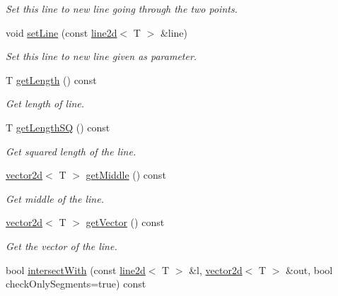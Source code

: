 \begin{DoxyCompactItemize}
\begin{DoxyCompactList}\small\item\em Set this line to new line going through the two points. \end{DoxyCompactList}\item 
\mbox{\label{classirr_1_1core_1_1line2d_af7a159fc82aff5dcab173fcd24934df1}} 
void \hyperlink{classirr_1_1core_1_1line2d_af7a159fc82aff5dcab173fcd24934df1}{set\+Line} (const \hyperlink{classirr_1_1core_1_1line2d}{line2d}$<$ T $>$ \&line)
\begin{DoxyCompactList}\small\item\em Set this line to new line given as parameter. \end{DoxyCompactList}\item 
T \hyperlink{classirr_1_1core_1_1line2d_a7322cb613e5e076ce6ff258e0f67dc0a}{get\+Length} () const
\begin{DoxyCompactList}\small\item\em Get length of line. \end{DoxyCompactList}\item 
T \hyperlink{classirr_1_1core_1_1line2d_ab2e1b51af84b3f134a32ebb0b7e6968f}{get\+Length\+SQ} () const
\begin{DoxyCompactList}\small\item\em Get squared length of the line. \end{DoxyCompactList}\item 
\hyperlink{classirr_1_1core_1_1vector2d}{vector2d}$<$ T $>$ \hyperlink{classirr_1_1core_1_1line2d_a18c94540c89997e0a4acc96e08f6f4a0}{get\+Middle} () const
\begin{DoxyCompactList}\small\item\em Get middle of the line. \end{DoxyCompactList}\item 
\hyperlink{classirr_1_1core_1_1vector2d}{vector2d}$<$ T $>$ \hyperlink{classirr_1_1core_1_1line2d_aeb0b7bc3987165abc0eaca7f0e506a59}{get\+Vector} () const
\begin{DoxyCompactList}\small\item\em Get the vector of the line. \end{DoxyCompactList}\item 
bool \hyperlink{classirr_1_1core_1_1line2d_aafba758c667b6d03b7a6e0f51a5831f0}{intersect\+With} (const \hyperlink{classirr_1_1core_1_1line2d}{line2d}$<$ T $>$ \&l, \hyperlink{classirr_1_1core_1_1vector2d}{vector2d}$<$ T $>$ \&out, bool check\+Only\+Segments=true) const

\end{DoxyCompactItemize}
